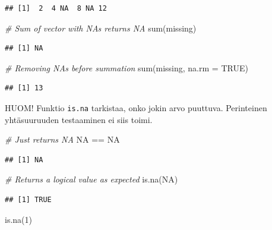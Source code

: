 \documentclass[
]{book}
\newenvironment{Shaded}{\begin{snugshade}}{\end{snugshade}}
\newcommand{\AttributeTok}[1]{\textcolor[rgb]{0.77,0.63,0.00}{#1}}
\newcommand{\CommentTok}[1]{\textcolor[rgb]{0.56,0.35,0.01}{\textit{#1}}}
\newcommand{\ConstantTok}[1]{\textcolor[rgb]{0.00,0.00,0.00}{#1}}
\newcommand{\DecValTok}[1]{\textcolor[rgb]{0.00,0.00,0.81}{#1}}
\newcommand{\FunctionTok}[1]{\textcolor[rgb]{0.00,0.00,0.00}{#1}}
\newcommand{\NormalTok}[1]{#1}
\newcommand{\SpecialCharTok}[1]{\textcolor[rgb]{0.00,0.00,0.00}{#1}}
\begin{document}
\begin{verbatim}
## [1]  2  4 NA  8 NA 12
\end{verbatim}

\begin{Shaded}
\begin{Highlighting}[]
\CommentTok{\# Sum of vector with NAs returns NA}
\FunctionTok{sum}\NormalTok{(missing)}
\end{Highlighting}
\end{Shaded}

\begin{verbatim}
## [1] NA
\end{verbatim}

\begin{Shaded}
\begin{Highlighting}[]
\CommentTok{\# Removing NAs before summation}
\FunctionTok{sum}\NormalTok{(missing, }\AttributeTok{na.rm =} \ConstantTok{TRUE}\NormalTok{)}
\end{Highlighting}
\end{Shaded}

\begin{verbatim}
## [1] 13
\end{verbatim}

HUOM! Funktio \texttt{is.na} tarkistaa, onko jokin arvo puuttuva. Perinteinen yhtäsuuruuden testaaminen ei siis toimi.

\begin{Shaded}
\begin{Highlighting}[]
\CommentTok{\# Just returns NA}
\ConstantTok{NA} \SpecialCharTok{==} \ConstantTok{NA}
\end{Highlighting}
\end{Shaded}

\begin{verbatim}
## [1] NA
\end{verbatim}

\begin{Shaded}
\begin{Highlighting}[]
\CommentTok{\# Returns a logical value as expected}
\FunctionTok{is.na}\NormalTok{(}\ConstantTok{NA}\NormalTok{)}
\end{Highlighting}
\end{Shaded}

\begin{verbatim}
## [1] TRUE
\end{verbatim}

\begin{Shaded}
\begin{Highlighting}[]
\FunctionTok{is.na}\NormalTok{(}\DecValTok{1}\NormalTok{)}
\end{Highlighting}
\end{Shaded}
\end{document}
